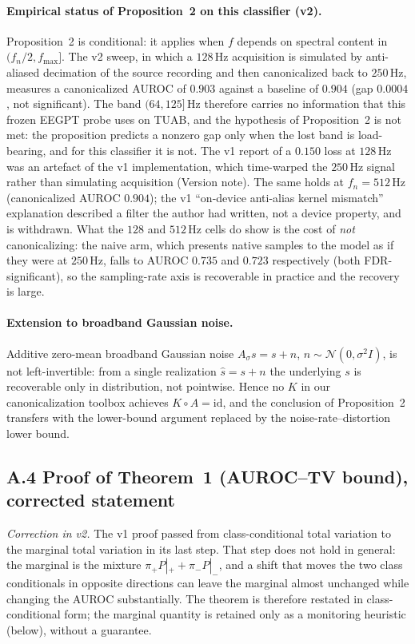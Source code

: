\documentclass[conference]{IEEEtran}
\begin{document}
\paragraph{Empirical status of Proposition~2 on this classifier (v2).}
Proposition~2 is conditional: it applies when $f$ depends on spectral
content in $(f_n/2, f_{\max}]$. The v2 sweep, in which a $128$\,Hz
acquisition is simulated by anti-aliased decimation of the source
recording and then canonicalized back to $250$\,Hz, measures a
canonicalized AUROC of $0.903$ against a baseline of $0.904$
(gap $0.0004$, not significant). The band $(64, 125]$\,Hz therefore
carries no information that this frozen EEGPT probe uses on TUAB, and
the hypothesis of Proposition~2 is not met: the proposition predicts a
nonzero gap only when the lost band is load-bearing, and for this
classifier it is not. The v1 report of a $0.150$ loss at $128$\,Hz was
an artefact of the v1 implementation, which time-warped the
$250$\,Hz signal rather than simulating acquisition (Version note).
The same holds at $f_n{=}512$\,Hz (canonicalized AUROC $0.904$); the
v1 ``on-device anti-alias kernel mismatch'' explanation described a
filter the author had written, not a device property, and is
withdrawn. What the $128$ and $512$\,Hz cells do show is the cost of
\emph{not} canonicalizing: the naive arm, which presents native samples
to the model as if they were at $250$\,Hz, falls to AUROC $0.735$ and
$0.723$ respectively (both FDR-significant), so the sampling-rate axis
is recoverable in practice and the recovery is large.

\paragraph{Extension to broadband Gaussian noise.} Additive
zero-mean broadband Gaussian noise $A_\sigma s = s + n$, $n \sim
\mathcal{N}(0, \sigma^2 I)$, is not left-invertible: from a single
realization $\hat{s} = s + n$ the underlying $s$ is recoverable only
in distribution, not pointwise. Hence no $K$ in our canonicalization
toolbox achieves $K \circ A = \mathrm{id}$, and the conclusion of
Proposition~2 transfers with the lower-bound argument replaced by the
noise-rate--distortion lower bound.

\subsection*{A.4 Proof of Theorem~1 (AUROC--TV bound), corrected statement}
\label{app:proof_tv}
\emph{Correction in v2.} The v1 proof passed from class-conditional total
variation to the marginal total variation in its last step. That step
does not hold in general: the marginal is the mixture
$\pi_+ P|_{+} + \pi_- P|_{-}$, and a shift that moves the two class
conditionals in opposite directions can leave the marginal almost
unchanged while changing the AUROC substantially. The theorem is
therefore restated in class-conditional form; the marginal quantity is
retained only as a monitoring heuristic (below), without a guarantee.
\end{document}
